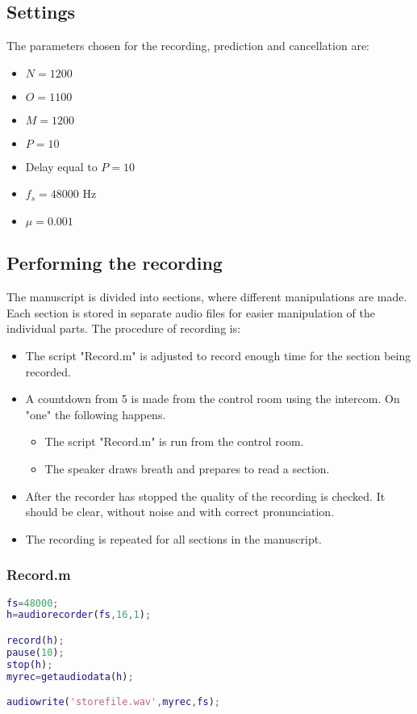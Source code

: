 \subsection{Settings}
The parameters chosen for the recording, prediction and cancellation are:
\begin{itemize}
	\item $N=1200$
	\item $O=1100$
	\item $M=1200$
	\item $P=10$
	\item Delay equal to $P=10$
	\item $f_s =48000$ Hz
	\item $\mu=0.001$
\end{itemize}

\subsection{Performing the recording}
The manuscript is divided into sections, where different manipulations are made. Each section is stored in separate audio files for easier manipulation of the individual parts. The procedure of recording is:
\begin{itemize}
	\item The script "Record.m" is adjusted to record enough time for the section being recorded. 
	\item A countdown from 5 is made from the control room using the intercom. On "one" the following happens.
	\begin{itemize}
		\item The script "Record.m" is run from the control room.
		\item The speaker draws breath and prepares to read a section.
	\end{itemize}
	\item After the recorder has stopped the quality of the recording is checked. It should be clear, without noise and with correct pronunciation.
	\item The recording is repeated for all sections in the manuscript.  
\end{itemize}

\subsubsection{Record.m}
\begin{lstlisting}[language=MATLAB,caption=Record.m]
fs=48000;
h=audiorecorder(fs,16,1);

record(h);
pause(10);
stop(h);
myrec=getaudiodata(h);

audiowrite('storefile.wav',myrec,fs);
\end{lstlisting}

